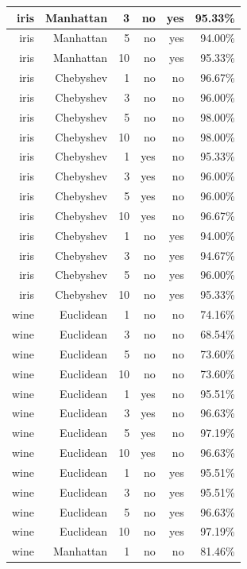 \documentclass{classrep}
\begin{document}
\begin{center}
\begin{longtable}{|r|r|r|r|r|r|}
	\hline
		iris & Manhattan & 3 & no & yes & 95.33\% \\
	\hline
		iris & Manhattan & 5 & no & yes & 94.00\% \\
	\hline
		iris & Manhattan & 10 & no & yes & 95.33\% \\
	\hline
		iris & Chebyshev & 1 & no & no & 96.67\% \\
	\hline
		iris & Chebyshev & 3 & no & no & 96.00\% \\
	\hline
		iris & Chebyshev & 5 & no & no & 98.00\% \\
	\hline
		iris & Chebyshev & 10 & no & no & 98.00\% \\
	\hline
		iris & Chebyshev & 1 & yes & no & 95.33\% \\
	\hline
		iris & Chebyshev & 3 & yes & no & 96.00\% \\
	\hline
		iris & Chebyshev & 5 & yes & no & 96.00\% \\
	\hline
		iris & Chebyshev & 10 & yes & no & 96.67\% \\
	\hline
		iris & Chebyshev & 1 & no & yes & 94.00\% \\
	\hline
		iris & Chebyshev & 3 & no & yes & 94.67\% \\
	\hline
		iris & Chebyshev & 5 & no & yes & 96.00\% \\
	\hline
		iris & Chebyshev & 10 & no & yes & 95.33\% \\
	\hline
	\hline
		wine & Euclidean & 1 & no & no & 74.16\% \\
	\hline
		wine & Euclidean & 3 & no & no & 68.54\% \\
	\hline
		wine & Euclidean & 5 & no & no & 73.60\% \\
	\hline
		wine & Euclidean & 10 & no & no & 73.60\% \\
	\hline
		wine & Euclidean & 1 & yes & no & 95.51\% \\
	\hline
		wine & Euclidean & 3 & yes & no & 96.63\% \\
	\hline
		wine & Euclidean & 5 & yes & no & 97.19\% \\
	\hline
		wine & Euclidean & 10 & yes & no & 96.63\% \\
	\hline
		wine & Euclidean & 1 & no & yes & 95.51\% \\
	\hline
		wine & Euclidean & 3 & no & yes & 95.51\% \\
	\hline
		wine & Euclidean & 5 & no & yes & 96.63\% \\
	\hline
		wine & Euclidean & 10 & no & yes & 97.19\% \\
	\hline
		wine & Manhattan & 1 & no & no & 81.46\% \\

\end{longtable}
\end{center}
\end{document}
